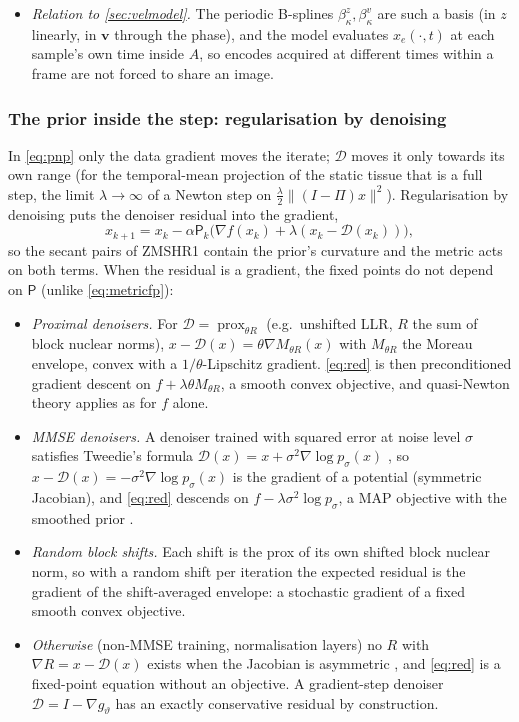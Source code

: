 \documentclass[11pt]{article}
\theoremstyle{remark}
\begin{document}
\begin{itemize}
  \item \emph{Relation to \cref{sec:velmodel}.} The periodic B-splines $\beta^z_\kappa,\beta^v_\kappa$ are such a basis (in $z$ linearly, in $\bm v$ through the phase), and the model evaluates $x_e(\cdot,t)$ at each sample's own time inside $A$, so encodes acquired at different times within a frame are not forced to share an image.
\end{itemize}

\subsubsection*{The prior inside the step: regularisation by denoising}
In \eqref{eq:pnp} only the data gradient moves the iterate; $\mathcal D$ moves it only towards its own range (for the temporal-mean projection of the static tissue that is a full step, the limit $\lambda\to\infty$ of a Newton step on $\frac\lambda2\|(I-\Pi)x\|^2$). Regularisation by denoising \cite{romano2017red} puts the denoiser residual into the gradient,
\begin{equation}
  x_{k+1}=x_k-\alpha\mathsf P_k\bigl(\nabla f(x_k)+\lambda(x_k-\mathcal D(x_k))\bigr),
  \label{eq:red}
\end{equation}
so the secant pairs of ZMSHR1 contain the prior's curvature and the metric acts on both terms. When the residual is a gradient, the fixed points do not depend on $\mathsf P$ (unlike \eqref{eq:metricfp}):
\begin{itemize}
  \item \emph{Proximal denoisers.} For $\mathcal D=\operatorname{prox}_{\theta R}$ (e.g.\ unshifted LLR, $R$ the sum of block nuclear norms), $x-\mathcal D(x)=\theta\nabla M_{\theta R}(x)$ with $M_{\theta R}$ the Moreau envelope, convex with a $1/\theta$-Lipschitz gradient. \eqref{eq:red} is then preconditioned gradient descent on $f+\lambda\theta M_{\theta R}$, a smooth convex objective, and quasi-Newton theory applies as for $f$ alone.
  \item \emph{MMSE denoisers.} A denoiser trained with squared error at noise level $\sigma$ satisfies Tweedie's formula $\mathcal D(x)=x+\sigma^2\nabla\log p_\sigma(x)$ \cite{efron2011tweedie}, so $x-\mathcal D(x)=-\sigma^2\nabla\log p_\sigma(x)$ is the gradient of a potential (symmetric Jacobian), and \eqref{eq:red} descends on $f-\lambda\sigma^2\log p_\sigma$, a MAP objective with the smoothed prior \cite{kadkhodaie2021implicit}.
  \item \emph{Random block shifts.} Each shift is the prox of its own shifted block nuclear norm, so with a random shift per iteration the expected residual is the gradient of the shift-averaged envelope: a stochastic gradient of a fixed smooth convex objective.
  \item \emph{Otherwise} (non-MMSE training, normalisation layers) no $R$ with $\nabla R=x-\mathcal D(x)$ exists when the Jacobian is asymmetric \cite{reehorst2019red}, and \eqref{eq:red} is a fixed-point equation without an objective. A gradient-step denoiser $\mathcal D=I-\nabla g_\vartheta$ \cite{hurault2022gs} has an exactly conservative residual by construction.
\end{itemize}
\end{document}

